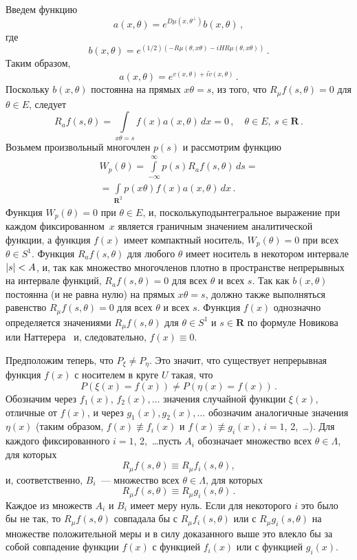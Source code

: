 \begin{multicols}{2}
Введем функцию
$$
a(x,\theta)=e^{D\mu(x,\theta^{\perp})}b(x,\theta)\,,
$$ 
где
$$
b(x,\theta)=e^{(1/2)\left(-R\mu(\theta,x\theta)-iHR\mu(\theta,x\theta)\right)}\,.
$$
Таким образом,
$$
a(x,\theta)=e^{v(x,\theta)+i\tilde{v}(x,\theta)}\,.
$$ 
Поскольку $b(x,\theta)$ постоянна на прямых $x\theta=s$, из того, что
$R_{\mu}f(s,\theta)=0$ для $\theta\in E$, следует
$$
R_{a}f(s,\theta)=\int\limits_{x\theta=s}f(x)a(x,\theta)\,dx=0\,,\quad
\theta\in E,\  s\in\mathbf{R}\,.
$$ 
Возьмем произвольный многочлен $p(s)$ и рас\-смот\-рим функцию
\begin{multline*}
W_p(\theta)=\int\limits_{-\infty}^{\infty}p(s)R_{a}f(s,\theta)\,ds={}\\
{}=\int\limits_{\mathbf{R}^2}p(x \theta)f(x)a(x,\theta)\,dx\,.
\end{multline*}
Функция $W_p(\theta)=0$ при $\theta\in E$, и, поскольку\linebreak подынтегральное
выражение при каждом фиксированном~$x$ является граничным
значением аналитической функции, а функция $f(x)$ имеет компактный
носитель, $W_p(\theta)=0$ при всех $\theta\in S^1$. Функция
$R_{a}f(s,\theta)$ для любого $\theta$ имеет носитель в некотором
интервале $\left\vert s\right\vert<A$, и, так как множество многочленов плотно в
пространстве непрерывных на интервале функций,
$R_{a}f(s,\theta)=0$ для всех $\theta$ и всех $s$. Так как
$b(x,\theta)$ постоянна (и не равна нулю) на прямых
$x\theta=s$, должно также выполняться равенство $R_{\mu}f(s,\theta)=0$
для всех $\theta$ и всех $s$. Функция $f(x)$ однозначно
определяется значениями $R_{\mu}f(s,\theta)$ для $\theta\in S^1$ и
$s\in\mathbf{R}$ по формуле Новикова~\cite{2u} или Наттерера~\cite{3u} и,
следовательно, $f(x)\equiv0$.

Предположим теперь, что $P_\xi\not=P_\eta$. Это значит, что
существует непрерывная функция $f(x)$ с носителем в круге $U$
такая, что 
$$
P(\xi(x)=f(x))\not=P(\eta(x)=f(x))\,.
$$ 
Обозначим через
$f_1(x)$, $f_2(x),\ldots$ значения случайной функции $\xi(x)$,
отличные от $f(x)$, и  через
$g_1(x),g_2(x),\ldots$ обозначим аналогичные значения $\eta(x)$ (таким образом, $f(x)\not\equiv f_i(x)$ и
$f(x)\not\equiv g_i(x)$, $i=1$, 2,\ \ldots). Для каждого фиксированного
$i=1$, 2,\ \ldots пусть $A_i$ обозначает множество всех
$\theta\in\Lambda$, для которых $$R_{\mu}f(s,\theta)\equiv
R_{\mu}f_i(s,\theta),$$ и, соответственно, $B_i$~--- множество всех $\theta\in\Lambda$, для которых
$$
R_{\mu}f(s,\theta)\equiv R_{\mu}g_i(s,\theta)\,.
$$ 
Каждое из множеств $A_i$ и $B_i$ имеет меру нуль. Если для некоторого $i$
это было бы не так, то $R_{\mu}f(s,\theta)$ совпадала бы с
$R_{\mu}f_i(s,\theta)$ или с $R_{\mu}g_i(s,\theta)$ на множестве
положительной меры и в силу доказанного выше это влекло бы за
собой совпадение функции $f(x)$ с функцией $f_i(x)$ или с функцией
$g_i(x)$.


\end{multicols}
